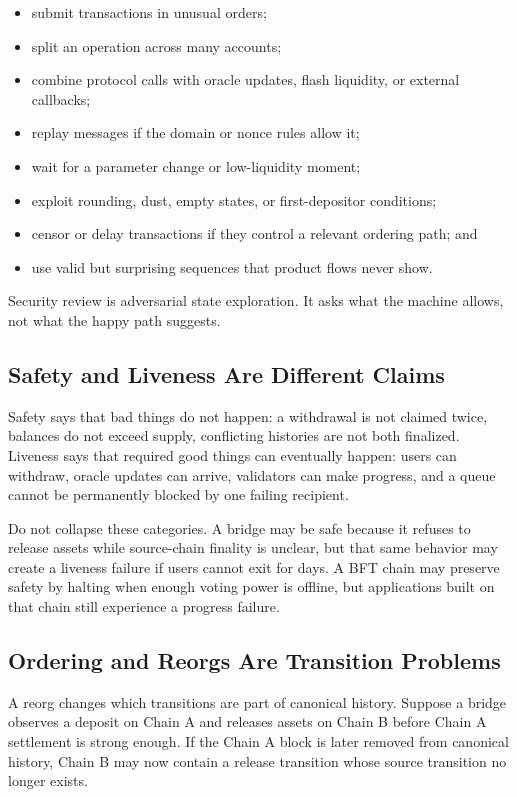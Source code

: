 \begin{itemize}
\item submit transactions in unusual orders;
\item split an operation across many accounts;
\item combine protocol calls with oracle updates, flash liquidity, or external callbacks;
\item replay messages if the domain or nonce rules allow it;
\item wait for a parameter change or low-liquidity moment;
\item exploit rounding, dust, empty states, or first-depositor conditions;
\item censor or delay transactions if they control a relevant ordering path; and
\item use valid but surprising sequences that product flows never show.
\end{itemize}

Security review is adversarial state exploration. It asks what the machine allows, not what the happy path suggests.

\subsection{Safety and Liveness Are Different Claims}

Safety says that bad things do not happen: a withdrawal is not claimed twice, balances do not exceed supply, conflicting histories are not both finalized. Liveness says that required good things can eventually happen: users can withdraw, oracle updates can arrive, validators can make progress, and a queue cannot be permanently blocked by one failing recipient.

Do not collapse these categories. A bridge may be safe because it refuses to release assets while source-chain finality is unclear, but that same behavior may create a liveness failure if users cannot exit for days. A BFT chain may preserve safety by halting when enough voting power is offline, but applications built on that chain still experience a progress failure.

\subsection{Ordering and Reorgs Are Transition Problems}

A reorg changes which transitions are part of canonical history. Suppose a bridge observes a deposit on Chain A and releases assets on Chain B before Chain A settlement is strong enough. If the Chain A block is later removed from canonical history, Chain B may now contain a release transition whose source transition no longer exists.

